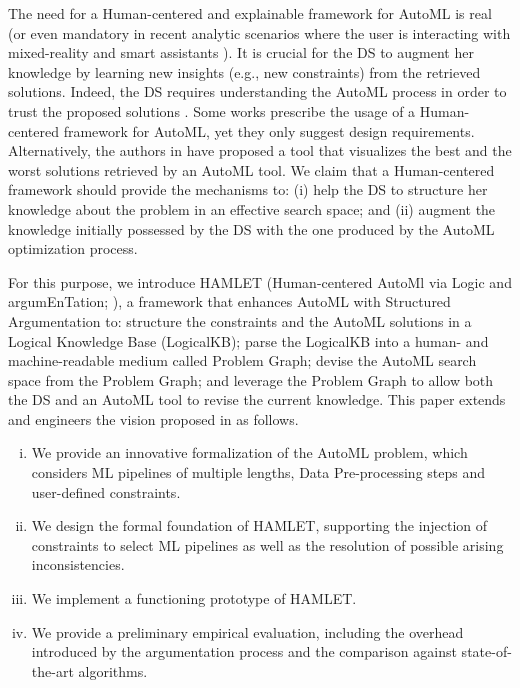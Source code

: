 The need for a Human-centered and explainable framework for AutoML is real \cite{gil2019towards, lee2020human, wang2019human} (or even mandatory in recent analytic scenarios where the user is interacting with mixed-reality and smart assistants \cite{DBLP:conf/dolap/FranciaGR19,DBLP:journals/is/FranciaGG22}).
It is crucial for the DS to augment her knowledge by learning new insights (e.g., new constraints) from the retrieved solutions.
Indeed, the DS requires understanding the AutoML process in order to trust the proposed solutions \cite{drozdal2020trust}.
Some works \cite{gil2019towards, lee2020human, wang2019human} prescribe the usage of a Human-centered framework for AutoML, yet they only suggest design requirements.
Alternatively, the authors in \cite{ono2020pipelineprofiler} have proposed a tool that visualizes the best and the worst solutions retrieved by an AutoML tool.
We claim that a Human-centered framework should provide the mechanisms to: (i) help the DS to structure her knowledge about the problem in an effective search space; and (ii) augment the knowledge initially possessed by the DS with the one produced by the AutoML optimization process. 

For this purpose, we introduce HAMLET (Human-centered AutoMl via Logic and argumEnTation; ), a framework that enhances AutoML with Structured Argumentation to:
structure the constraints and the AutoML solutions in a Logical Knowledge Base (LogicalKB);
parse the LogicalKB into a human- and machine-readable medium called Problem Graph;
devise the AutoML search space from the Problem Graph;
and leverage the Problem Graph to allow both the DS and an AutoML tool to revise the current knowledge.
This paper extends and engineers the vision proposed in \cite{DBLP:conf/edbt/GiovanelliP22} as follows.
\begin{enumerate}[(i)]
    \item We provide an innovative formalization of the AutoML problem, which considers ML pipelines of multiple lengths, Data Pre-processing steps and user-defined constraints.
    \item We design the formal foundation of HAMLET, supporting the injection of constraints to select ML pipelines as well as the resolution of possible arising inconsistencies.
    \item We implement a functioning prototype of HAMLET.
    \item We provide a preliminary empirical evaluation, including the overhead introduced by the argumentation process and the comparison against state-of-the-art algorithms. 
\end{enumerate}

